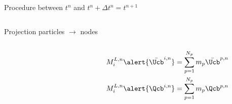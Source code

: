 \begin{frame}{Procedure between $t^n$ and $t^n + \Delta t^n=t^{n+1}$}
\begin{footnotesize}
\begin{overprint}
\begin{columns}
\begin{column}{0.6\textwidth}
\begin{block}{Projection particles $\rightarrow$ nodes}
\begin{columns}
\begin{column}{0.3\textwidth}
              \end{column}
              \begin{column}{0.6\textwidth}
                \begin{equation*}
                  \begin{aligned}
                    & M^{L,n}_i \alert{\bar{\Ucb}^{i,n}} = \sum_{p=1}^{N_p} m_p \bar{\Ucb}^{p,n}\\
                    & M^{L,n}_i \alert{\Qcb^{i,n}} = \sum_{p=1}^{N_p} m_p \Qcb^{p,n}
                  \end{aligned}
                \end{equation*}
              \end{column}
            \end{columns}
          \end{block}
        \end{column}
      \end{columns}
      

\end{overprint}
\end{footnotesize}
\end{frame}
